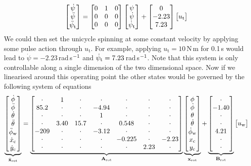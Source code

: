 \begin{equation*}
\begin{bmatrix} \dot\psi \\ \ddot\psi \\ \ddot\psi_{\text{t}} \end{bmatrix} = 
\begin{bmatrix} 0 & 1 & 0 \\ 0 & 0 & 0 \\ 0 & 0 & 0 \end{bmatrix}
\begin{bmatrix} \psi \\ \dot\psi \\ \dot\psi_{\text{t}} \end{bmatrix}
+
\begin{bmatrix} 0 \\ -2.23 \\ 7.23 \end{bmatrix} \begin{bmatrix}  u_{\text{t}}  \end{bmatrix}
\end{equation*}
We could then set the unicycle spinning at some constant velocity by applying some pulse action through $u_{\text{t}}$. For example, applying $u_{\text{t}}=10\,$N$\,$m for 0.1$\,$s would lead to $\dot\psi = -2.23\,$rad$\,$s$^{-1}$ and $\dot\psi_{\text{t}} = 7.23\,$rad$\,$s$^{-1}$. Note that this system is only controllable along a single dimension of the two dimensional space. Now if we linearised around this operating point the other states would be governed by the following system of equations
\begin{equation}
\underbrace{
\begin{bmatrix}   \dot\phi \\ \ddot\phi \\ \dot\theta \\ \ddot\theta \\ \ddot\phi_{\text{w}} \\ \dot x_{\text{c}} \\  \dot y_{\text{c}}  \end{bmatrix}
}_{\dot{\mathbf{x}}_{\text{rot}}}
=
\underbrace{ \begin{bmatrix} 
\cdot  &  1 & \cdot & \cdot & \cdot  &  \cdot & \cdot \\
85.2  &  \cdot & \cdot & -4.94 & \cdot &  \cdot & \cdot \\
\cdot  &  \cdot & \cdot & 1 & \cdot  & \cdot & \cdot \\
\cdot  &  3.40 & 15.7 & \cdot & 0.548  & \cdot & \cdot \\
-209  &  \cdot & \cdot & -3.12 & \cdot  & \cdot & \cdot \\
\cdot  &  \cdot & \cdot & \cdot & -0.225  & \cdot & -2.23 \\
\cdot  &  \cdot & \cdot & \cdot & \cdot  & 2.23 & \cdot 
 \end{bmatrix}
}_{\mathbf{A}_{\text{rot}}}
\underbrace{
\begin{bmatrix}   \phi \\ \dot\phi \\ \theta \\ \dot\theta  \\ \dot\phi_{\text{w}}  \\ x_{\text{c}} \\  y_{\text{c}}   \end{bmatrix} 
}_{\mathbf{x}_{\text{rot}}}
+
\underbrace{ \begin{bmatrix} 
\cdot \\
-1.40 \\
\cdot \\
\cdot \\
4.21 \\
\cdot \\
\cdot
 \end{bmatrix}
}_{\mathbf{B}_{\text{rot}}}
\begin{bmatrix} u_{\text{w}}  \end{bmatrix}
\label{eqn:LQmodel}
\end{equation}
